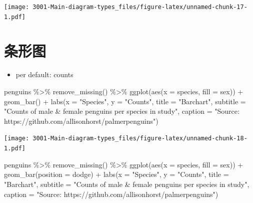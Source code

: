 \documentclass[
]{book}
\newenvironment{Shaded}{\begin{snugshade}}{\end{snugshade}}
\newcommand{\AttributeTok}[1]{\textcolor[rgb]{0.77,0.63,0.00}{#1}}
\newcommand{\FunctionTok}[1]{\textcolor[rgb]{0.00,0.00,0.00}{#1}}
\newcommand{\NormalTok}[1]{#1}
\newcommand{\SpecialCharTok}[1]{\textcolor[rgb]{0.00,0.00,0.00}{#1}}
\newcommand{\StringTok}[1]{\textcolor[rgb]{0.31,0.60,0.02}{#1}}
\providecommand{\tightlist}{%
  \setlength{\itemsep}{0pt}\setlength{\parskip}{0pt}}
\begin{document}
\texttt{[image: 3001-Main-diagram-types\_files/figure-latex/unnamed-chunk-17-1.pdf]}

\hypertarget{ux6761ux5f62ux56fe-1}{%
\section{条形图}\label{ux6761ux5f62ux56fe-1}}

\begin{itemize}
\tightlist
\item
  per default: counts
\end{itemize}

\begin{Shaded}
\begin{Highlighting}[]
\NormalTok{penguins }\SpecialCharTok{\%\textgreater{}\%}
    \FunctionTok{remove\_missing}\NormalTok{() }\SpecialCharTok{\%\textgreater{}\%}
    \FunctionTok{ggplot}\NormalTok{(}\FunctionTok{aes}\NormalTok{(}\AttributeTok{x =}\NormalTok{ species,}
               \AttributeTok{fill =}\NormalTok{ sex)) }\SpecialCharTok{+}
    \FunctionTok{geom\_bar}\NormalTok{() }\SpecialCharTok{+}
      \FunctionTok{labs}\NormalTok{(}\AttributeTok{x =} \StringTok{"Species"}\NormalTok{, }
           \AttributeTok{y =} \StringTok{"Counts"}\NormalTok{,}
          \AttributeTok{title =} \StringTok{"Barchart"}\NormalTok{, }
          \AttributeTok{subtitle =} \StringTok{"Counts of male \& female penguins per species in study"}\NormalTok{,}
          \AttributeTok{caption =} \StringTok{"Source: https://github.com/allisonhorst/palmerpenguins"}\NormalTok{)}
\end{Highlighting}
\end{Shaded}

\texttt{[image: 3001-Main-diagram-types\_files/figure-latex/unnamed-chunk-18-1.pdf]}

\begin{Shaded}
\begin{Highlighting}[]
\NormalTok{penguins }\SpecialCharTok{\%\textgreater{}\%}
    \FunctionTok{remove\_missing}\NormalTok{() }\SpecialCharTok{\%\textgreater{}\%}
    \FunctionTok{ggplot}\NormalTok{(}\FunctionTok{aes}\NormalTok{(}\AttributeTok{x =}\NormalTok{ species,}
               \AttributeTok{fill =}\NormalTok{ sex)) }\SpecialCharTok{+}
    \FunctionTok{geom\_bar}\NormalTok{(}\AttributeTok{position =} \StringTok{\textquotesingle{}dodge\textquotesingle{}}\NormalTok{) }\SpecialCharTok{+}
      \FunctionTok{labs}\NormalTok{(}\AttributeTok{x =} \StringTok{"Species"}\NormalTok{, }
           \AttributeTok{y =} \StringTok{"Counts"}\NormalTok{,}
          \AttributeTok{title =} \StringTok{"Barchart"}\NormalTok{, }
          \AttributeTok{subtitle =} \StringTok{"Counts of male \& female penguins per species in study"}\NormalTok{,}
          \AttributeTok{caption =} \StringTok{"Source: https://github.com/allisonhorst/palmerpenguins"}\NormalTok{)}
\end{Highlighting}
\end{Shaded}
\end{document}
